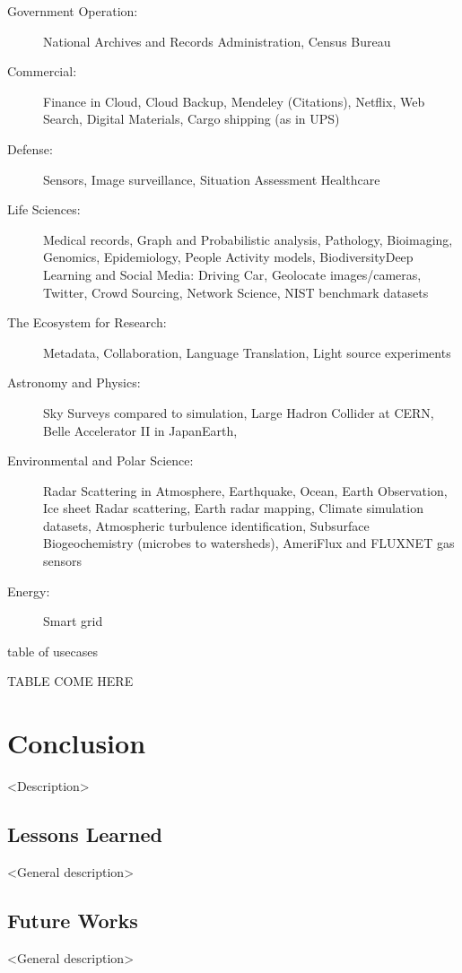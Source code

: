 \begin{description}

\item[Government Operation:] National Archives and Records
  Administration, Census Bureau

\item[Commercial:] Finance in Cloud, Cloud Backup, Mendeley
  (Citations), Netflix, Web Search, Digital Materials, Cargo shipping
  (as in UPS)

\item[Defense:] Sensors, Image surveillance, Situation Assessment
  Healthcare

\item[Life Sciences:] Medical records, Graph and Probabilistic
  analysis, Pathology, Bioimaging, Genomics, Epidemiology, People
  Activity models, BiodiversityDeep Learning and Social Media: Driving
  Car, Geolocate images/cameras, Twitter, Crowd Sourcing, Network
  Science, NIST benchmark datasets

\item[The Ecosystem for Research:] Metadata, Collaboration, Language
  Translation, Light source experiments

\item[Astronomy and Physics:] Sky Surveys compared to simulation,
  Large Hadron Collider at CERN, Belle Accelerator II in JapanEarth,

\item[Environmental and Polar Science:] Radar Scattering in
  Atmosphere, Earthquake, Ocean, Earth Observation, Ice sheet Radar
  scattering, Earth radar mapping, Climate simulation datasets,
  Atmospheric turbulence identification, Subsurface Biogeochemistry
  (microbes to watersheds), AmeriFlux and FLUXNET gas sensors

\item[Energy:] Smart grid

\end{description}

\begin{table}[htb]

\caption{table of usecases}
\label{T:usecases}

TABLE COME HERE

\end{table}


\section{Conclusion}

<Description> 

\subsection{Lessons Learned}

<General description>

\subsection{Future Works}


<General description>




